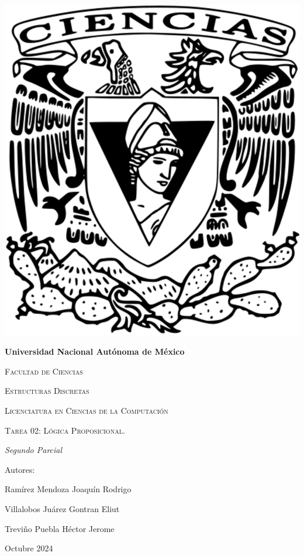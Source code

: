 \documentclass[oneside]{book}
\begin{document}
\begin{titlepage}
\begin{minipage}{10cm}
	\end{minipage}\hfill
	\begin{minipage}{3cm}
		\begin{center}
			\includegraphics[height = 0.14\textheight]{recursos/Logo_FC.png}\par
		\end{center}
	\end{minipage}
	\centering
	\vspace{1cm}

	{\bfseries\LARGE Universidad Nacional Autónoma de México \par}

	\vspace{1cm}
	{\scshape\Large Facultad de Ciencias \par}
	\vspace{1cm}
	{\scshape\Large Estructuras Discretas \par}
	\vspace{1cm}
	{\scshape\Large Licenciatura en Ciencias de la Computación \par}
	\vspace{1cm}
	{\scshape\Huge Tarea 02: Lógica Proposicional.  \par}
	\vspace{3cm}
	{\itshape\Large Segundo Parcial \par}
	\vfill
	{\Large Autores: \par}
	{\Large Ramírez Mendoza Joaquín Rodrigo \par}
	{\Large Villalobos Juárez Gontran Eliut\par}
	{\Large Treviño Puebla Héctor Jerome \par}
	\vfill
	{\Large Octubre 2024 \par}
\end{titlepage}
\end{document}
